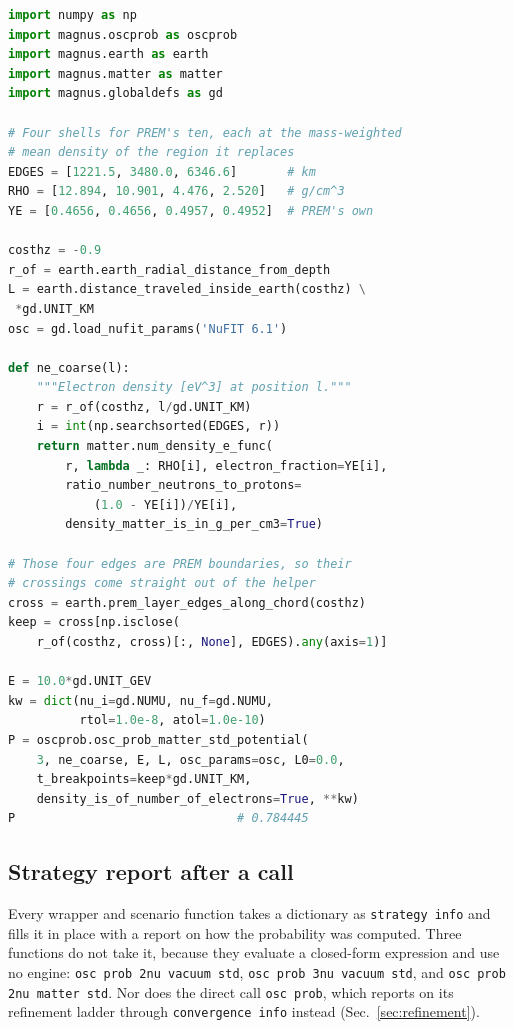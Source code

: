 \documentclass[final,5p,times,twocolumn,sort,compress]{elsarticle}
\makeatletter
\DeclareRobustCommand{\_}{%
  \ifmmode\nfss@text{\textunderscore}\else\textunderscore\allowbreak\fi}
\makeatother
\begin{document}
\begin{lstlisting}[language=Python, caption={\textbf{A custom Earth profile.} A four-shell Earth in place of PREM. The profile is a function of position that returns an electron density; naming the radii where it jumps keeps every slab inside one shell. See Sec.~\ref{sec:custom_earth} for details.}, label={lst:coarse_earth}, float=tbp]
import numpy as np
import magnus.oscprob as oscprob
import magnus.earth as earth
import magnus.matter as matter
import magnus.globaldefs as gd

# Four shells for PREM's ten, each at the mass-weighted
# mean density of the region it replaces
EDGES = [1221.5, 3480.0, 6346.6]       # km
RHO = [12.894, 10.901, 4.476, 2.520]   # g/cm^3
YE = [0.4656, 0.4656, 0.4957, 0.4952]  # PREM's own

costhz = -0.9
r_of = earth.earth_radial_distance_from_depth
L = earth.distance_traveled_inside_earth(costhz) \
 *gd.UNIT_KM
osc = gd.load_nufit_params('NuFIT 6.1')

def ne_coarse(l):
    """Electron density [eV^3] at position l."""
    r = r_of(costhz, l/gd.UNIT_KM)
    i = int(np.searchsorted(EDGES, r))
    return matter.num_density_e_func(
        r, lambda _: RHO[i], electron_fraction=YE[i],
        ratio_number_neutrons_to_protons=
            (1.0 - YE[i])/YE[i],
        density_matter_is_in_g_per_cm3=True)

# Those four edges are PREM boundaries, so their
# crossings come straight out of the helper
cross = earth.prem_layer_edges_along_chord(costhz)
keep = cross[np.isclose(
    r_of(costhz, cross)[:, None], EDGES).any(axis=1)]

E = 10.0*gd.UNIT_GEV
kw = dict(nu_i=gd.NUMU, nu_f=gd.NUMU,
          rtol=1.0e-8, atol=1.0e-10)
P = oscprob.osc_prob_matter_std_potential(
    3, ne_coarse, E, L, osc_params=osc, L0=0.0,
    t_breakpoints=keep*gd.UNIT_KM,
    density_is_of_number_of_electrons=True, **kw)
P                               # 0.784445
\end{lstlisting}


\subsection{Strategy report after a call}
\label{sec:which_engine}

Every wrapper and scenario function takes a dictionary as {\tt strategy\_info} and fills it in place with a report on how the probability was computed. Three functions do not take it, because they evaluate a closed-form expression and use no engine: {\tt osc\_prob\_2nu\_vacuum\_std}, {\tt osc\_prob\_3nu\_vacuum\_std}, and {\tt osc\_prob\_2nu\_matter\_std}. Nor does the direct call {\tt osc\_prob}, which reports on its refinement ladder through {\tt convergence\_info} instead (Sec.~\ref{sec:refinement}).
\end{document}
